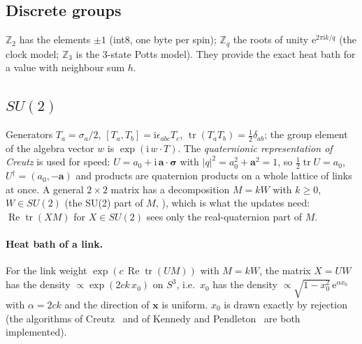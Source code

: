 \documentclass[11pt]{article}
\newcommand{\code}[1]{\texttt{\detokenize{#1}}}
\newcommand{\tr}{\operatorname{tr}}
\renewcommand{\Re}{\operatorname{Re}}
\newcommand{\ee}{\mathrm{e}}
\newcommand{\ii}{\mathrm{i}}
\begin{document}
\subsection{Discrete groups}
$\mathbb{Z}_2$ has the elements $\pm1$ (int8, one byte per spin); $\mathbb{Z}_q$ the roots of unity $\ee^{2\pi\ii k/q}$ (the clock model;
$\mathbb{Z}_3$ is the 3-state Potts model). They provide the exact heat bath for a value with neighbour sum $h$.

\subsection{$SU(2)$}
\label{sec:su2}
Generators $T_a=\sigma_a/2$, $[T_a,T_b]=\ii\epsilon_{abc}T_c$, $\tr(T_aT_b)=\tfrac12\delta_{ab}$; the group element of the algebra vector
$w$ is $\exp(\ii\,w\!\cdot\!T)$. The \emph{quaternionic representation of Creutz} is used for speed: $U=a_0+\ii\,\mathbf{a}\!\cdot\!\boldsymbol\sigma$
with $|q|^2=a_0^2+\mathbf{a}^2=1$, so $\tfrac12\tr U=a_0$, $U^\dagger=(a_0,-\mathbf{a})$ and products are quaternion products on a whole
lattice of links at once. A general $2\times2$ matrix has a decomposition $M=kW$ with $k\ge0$, $W\in SU(2)$ (the SU(2) part of $M$,
\code{su2_decompose}), which is what the updates need: $\Re\tr(XM)$ for $X\in SU(2)$ sees only the real-quaternion part of $M$.

\paragraph{Heat bath of a link.} For the link weight $\exp(c\,\Re\tr(UM))$ with $M=kW$, the matrix $X=UW$ has the density
$\propto\exp(2ck\,x_0)$ on $S^3$, i.e.\ $x_0$ has the density $\propto\sqrt{1-x_0^2}\,\ee^{\alpha x_0}$ with $\alpha=2ck$ and the direction of
$\mathbf{x}$ is uniform. $x_0$ is drawn exactly by rejection (the algorithms of Creutz~\cite{Creutz80} and of Kennedy and Pendleton~\cite{KP85} are both implemented).
\end{document}
